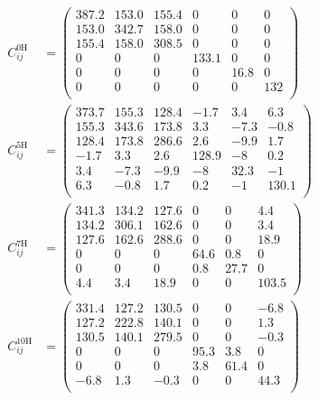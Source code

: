 \begin{align*}
C_{ij}^{\text{0H}} &= \begin{pmatrix}
387.2 & 153.0 & 155.4 & 0     & 0    & 0 \\
153.0 & 342.7 & 158.0 & 0     & 0    & 0 \\
155.4 & 158.0 & 308.5 & 0     & 0    & 0 \\
0     & 0     & 0     & 133.1 & 0    & 0 \\
0     & 0     & 0     & 0     & 16.8 & 0 \\
0     & 0     & 0     & 0     & 0    & 132 \\
\end{pmatrix} \\
C_{ij}^{\text{5H}} &= \begin{pmatrix}
373.7 & 155.3 & 128.4 & -1.7 & 3.4 & 6.3 \\
155.3 & 343.6 & 173.8 & 3.3 & -7.3 & -0.8 \\
128.4 & 173.8 & 286.6 & 2.6 & -9.9 & 1.7 \\
-1.7  & 3.3   & 2.6   & 128.9 & -8 & 0.2 \\
3.4   & -7.3  & -9.9  & -8 & 32.3 & -1 \\
6.3   & -0.8  & 1.7   & 0.2 & -1 & 130.1 \\
\end{pmatrix} \\
C_{ij}^{\text{7H}} &= \begin{pmatrix}
341.3 & 134.2 & 127.6 & 0 & 0 & 4.4 \\
134.2 & 306.1 & 162.6 & 0 & 0 & 3.4 \\
127.6 & 162.6 & 288.6 & 0 & 0 & 18.9 \\
0 & 0 & 0 & 64.6 & 0.8 & 0 \\
0 & 0 & 0 & 0.8 & 27.7 & 0 \\
4.4 & 3.4 & 18.9 & 0 & 0 & 103.5 \\
\end{pmatrix} \\
C_{ij}^{\text{10H}} &= \begin{pmatrix}
331.4 & 127.2 & 130.5 & 0 & 0 & -6.8 \\
127.2 & 222.8 & 140.1 & 0 & 0 & 1.3 \\
130.5 & 140.1 & 279.5 & 0 & 0 & -0.3 \\
0 & 0 & 0 & 95.3 & 3.8 & 0 \\
0 & 0 & 0 & 3.8 & 61.4 & 0 \\
-6.8 & 1.3 & -0.3 & 0 & 0 & 44.3 \\
\end{pmatrix}
\end{align*}

